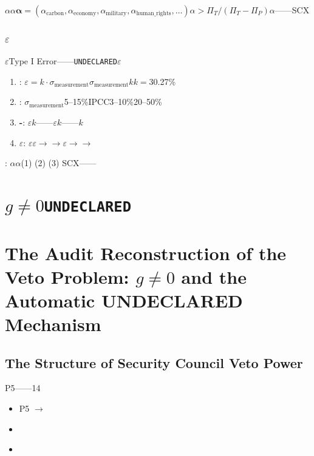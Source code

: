\documentclass[12pt,a4paper]{article}
\theoremstyle{remark}
\newcommand{\UNDECLARED}{\texttt{UNDECLARED}}
\begin{document}
$\alpha$$\alpha$\textbf{}$\boldsymbol{\alpha} = (\alpha_{\text{carbon}}, \alpha_{\text{economy}}, \alpha_{\text{military}}, \alpha_{\text{human\_rights}}, \ldots)$$\alpha > \Pi_T/(\Pi_T - \Pi_P)$$\alpha$——SCX

\subsubsection{$\varepsilon$}

$\varepsilon$Type I Error——\UNDECLARED{}$\varepsilon$

\begin{enumerate}[label=(\arabic*)]
    \item \textbf{}: $\varepsilon = k \cdot \sigma_{\text{measurement}}$$\sigma_{\text{measurement}}$$k$$k=3$0.27\%
    \item \textbf{}: $\sigma_{\text{measurement}}$5--15\%IPCC3--10\%20--50\%
    \item \textbf{-}: $\varepsilon$$k$——$\varepsilon$$k$——$k$
    \item \textbf{$\varepsilon$}: $\varepsilon$$\varepsilon$$\to$$\to$$\varepsilon \to$$\to$
\end{enumerate}

\textbf{}: $\alpha$$\alpha$(1) (2) (3) SCX——


\section{$g \neq 0$\UNDECLARED{}}
\section{The Audit Reconstruction of the Veto Problem: $g \neq 0$ and the Automatic UNDECLARED Mechanism}

\subsection{}
\subsection{The Structure of Security Council Veto Power}

P5——14

\begin{itemize}[nosep]
    \item P5 $\to$ 
    \item 
    \item \textbf{}
\end{itemize}
\end{document}
